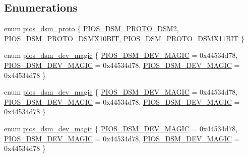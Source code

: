 \subsection*{\-Enumerations}
\begin{DoxyCompactItemize}
\item 
enum \hyperlink{group___p_i_o_s___d_s_m_ga0c64890f0b9cb4fd7681b2d92fad8bd9}{pios\-\_\-dsm\-\_\-proto} \{ \hyperlink{group___p_i_o_s___d_s_m_gga0c64890f0b9cb4fd7681b2d92fad8bd9ac1f20698946da8d49ca98423672c5c2f}{\-P\-I\-O\-S\-\_\-\-D\-S\-M\-\_\-\-P\-R\-O\-T\-O\-\_\-\-D\-S\-M2}, 
\hyperlink{group___p_i_o_s___d_s_m_gga0c64890f0b9cb4fd7681b2d92fad8bd9a72b98ff1fac8f28c46376c1b9219f229}{\-P\-I\-O\-S\-\_\-\-D\-S\-M\-\_\-\-P\-R\-O\-T\-O\-\_\-\-D\-S\-M\-X10\-B\-I\-T}, 
\hyperlink{group___p_i_o_s___d_s_m_gga0c64890f0b9cb4fd7681b2d92fad8bd9aac434e0720becbc427a60bae21582abd}{\-P\-I\-O\-S\-\_\-\-D\-S\-M\-\_\-\-P\-R\-O\-T\-O\-\_\-\-D\-S\-M\-X11\-B\-I\-T}
 \}
\item 
enum \hyperlink{group___p_i_o_s___d_s_m_gaa8fd2b8b7432f69244c6af0ffd1c3c4b}{pios\-\_\-dsm\-\_\-dev\-\_\-magic} \{ \hyperlink{group___p_i_o_s___d_s_m_ggaa8fd2b8b7432f69244c6af0ffd1c3c4ba519ec93ae372d40ba8c2958931e3ca86}{\-P\-I\-O\-S\-\_\-\-D\-S\-M\-\_\-\-D\-E\-V\-\_\-\-M\-A\-G\-I\-C} =  0x44534d78, 
\hyperlink{group___p_i_o_s___d_s_m_ggaa8fd2b8b7432f69244c6af0ffd1c3c4ba519ec93ae372d40ba8c2958931e3ca86}{\-P\-I\-O\-S\-\_\-\-D\-S\-M\-\_\-\-D\-E\-V\-\_\-\-M\-A\-G\-I\-C} =  0x44534d78, 
\hyperlink{group___p_i_o_s___d_s_m_ggaa8fd2b8b7432f69244c6af0ffd1c3c4ba519ec93ae372d40ba8c2958931e3ca86}{\-P\-I\-O\-S\-\_\-\-D\-S\-M\-\_\-\-D\-E\-V\-\_\-\-M\-A\-G\-I\-C} =  0x44534d78
 \}
\item 
enum \hyperlink{group___p_i_o_s___d_s_m_gaa8fd2b8b7432f69244c6af0ffd1c3c4b}{pios\-\_\-dsm\-\_\-dev\-\_\-magic} \{ \hyperlink{group___p_i_o_s___d_s_m_ggaa8fd2b8b7432f69244c6af0ffd1c3c4ba519ec93ae372d40ba8c2958931e3ca86}{\-P\-I\-O\-S\-\_\-\-D\-S\-M\-\_\-\-D\-E\-V\-\_\-\-M\-A\-G\-I\-C} =  0x44534d78, 
\hyperlink{group___p_i_o_s___d_s_m_ggaa8fd2b8b7432f69244c6af0ffd1c3c4ba519ec93ae372d40ba8c2958931e3ca86}{\-P\-I\-O\-S\-\_\-\-D\-S\-M\-\_\-\-D\-E\-V\-\_\-\-M\-A\-G\-I\-C} =  0x44534d78, 
\hyperlink{group___p_i_o_s___d_s_m_ggaa8fd2b8b7432f69244c6af0ffd1c3c4ba519ec93ae372d40ba8c2958931e3ca86}{\-P\-I\-O\-S\-\_\-\-D\-S\-M\-\_\-\-D\-E\-V\-\_\-\-M\-A\-G\-I\-C} =  0x44534d78
 \}
\item 
enum \hyperlink{group___p_i_o_s___d_s_m_gaa8fd2b8b7432f69244c6af0ffd1c3c4b}{pios\-\_\-dsm\-\_\-dev\-\_\-magic} \{ \hyperlink{group___p_i_o_s___d_s_m_ggaa8fd2b8b7432f69244c6af0ffd1c3c4ba519ec93ae372d40ba8c2958931e3ca86}{\-P\-I\-O\-S\-\_\-\-D\-S\-M\-\_\-\-D\-E\-V\-\_\-\-M\-A\-G\-I\-C} =  0x44534d78, 
\hyperlink{group___p_i_o_s___d_s_m_ggaa8fd2b8b7432f69244c6af0ffd1c3c4ba519ec93ae372d40ba8c2958931e3ca86}{\-P\-I\-O\-S\-\_\-\-D\-S\-M\-\_\-\-D\-E\-V\-\_\-\-M\-A\-G\-I\-C} =  0x44534d78, 
\hyperlink{group___p_i_o_s___d_s_m_ggaa8fd2b8b7432f69244c6af0ffd1c3c4ba519ec93ae372d40ba8c2958931e3ca86}{\-P\-I\-O\-S\-\_\-\-D\-S\-M\-\_\-\-D\-E\-V\-\_\-\-M\-A\-G\-I\-C} =  0x44534d78
 \}
\end{DoxyCompactItemize}
